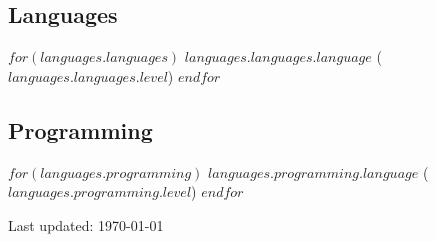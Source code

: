 \documentclass[11pt, a4paper]{article} %
\begin{document}
\subsection*{Languages}

$for(languages.languages)$
\textsc{$languages.languages.language$} ($languages.languages.level$)
$endfor$

\subsection*{Programming}

$for(languages.programming)$
\textsc{$languages.programming.language$} ($languages.programming.level$)
$endfor$



\vfill{} %


\begin{center}
{\scriptsize Last updated: \today} 
\end{center}

\end{document}

